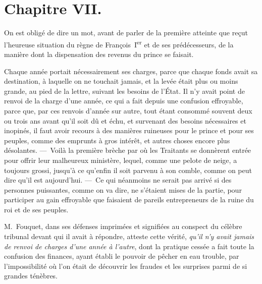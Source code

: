\documentclass[french,twoside]{book} %
\begin{document}
\section[{Chapitre VII.}]{Chapitre VII.}
\noindent On est obligé de dire un mot, avant de parler de la première atteinte que reçut l’heureuse situation du règne de François I\textsuperscript{er} et de ses prédécesseurs, de la manière dont la dispensation des revenus du prince se faisait.\par
Chaque année portait nécessairement ses charges, parce que chaque fonds avait sa destination, à laquelle on ne touchait jamais, et la levée était plus ou moins grande, au pied de la lettre, suivant les besoins de l’État. Il n’y avait point de renvoi de la charge d’une année, ce qui a fait depuis une confusion effroyable, parce que, par ces renvois d’année sur autre, tout étant consommé souvent deux ou trois ans avant qu’il soit dû et échu, et survenant des besoins nécessaires et inopinés, il faut avoir recours à des manières ruineuses pour le prince et pour ses peuples, comme des emprunts à gros intérêt, et autres choses encore plus désolantes. — Voilà la première brèche par où les Traitants se donnèrent entrée pour offrir leur malheureux ministère, lequel, comme une pelote de neige, a toujours grossi, jusqu’à ce qu’enfin il soit parvenu à son comble, comme on peut dire qu’il est aujourd’hui. — Ce qui néanmoins ne serait pas arrivé si des personnes puissantes, comme on va dire, ne s’étaient mises de la partie, pour participer au gain effroyable que faisaient de pareils entrepreneurs de la ruine du roi et de ses peuples.\par
M. Fouquet, dans ses défenses imprimées et signifiées au conspect du célèbre tribunal devant qui il avait à répondre, atteste cette vérité, {\itshape qu’il n’y avait jamais de renvoi de charges d’une année à l’autre}, dont la pratique cessée a fait toute la confusion des finances, ayant établi le pouvoir de pêcher en eau trouble, par l’impossibilité où l’on était de découvrir les fraudes et les surprises parmi de si grandes ténèbres.\par
\end{document}
